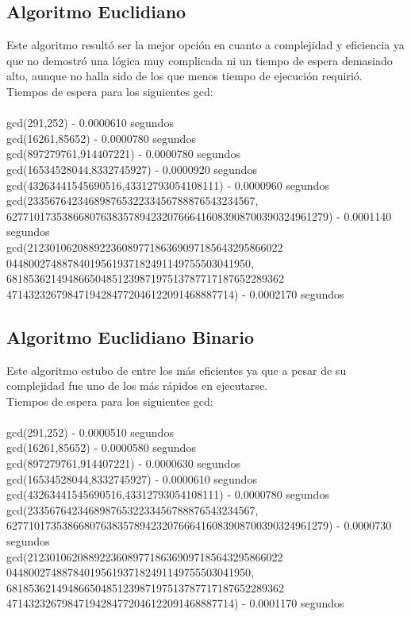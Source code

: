 \documentclass[12pt,letterpaper]{scrartcl}
\begin{document}
\subsection{Algoritmo Euclidiano}

Este algoritmo resultó ser la mejor opción en cuanto a complejidad y eficiencia ya que no demostró una lógica muy complicada ni un tiempo de espera demasiado alto, aunque no halla sido de los que menos tiempo de ejecución requirió.
\\
Tiempos de espera para los siguientes gcd:
\\\\
gcd(291,252) - 0.0000610 segundos
\\
gcd(16261,85652) - 0.0000780 segundos
\\
gcd(897279761,914407221) - 0.0000780 segundos
\\
gcd(16534528044,8332745927) - 0.0000920 segundos
\\
gcd(43263441545690516,43312793054108111) - 0.0000960 segundos
\\
gcd(23356764234689876532233456788876543234567,\\
6277101735386680763835789423207666416083908700390324961279) - 0.0001140 segundos
\\
gcd(2123010620889223608977186369097185643295866022\\04480027488784019561937182491149755503041950,\\
68185362149486650485123987197513787717187652289362\\47143232679847194284772046122091468887714) - 0.0002170 segundos


\newpage

\subsection{Algoritmo Euclidiano Binario}

Este algoritmo estubo de entre los más eficientes ya que a pesar de su complejidad fue uno de los más rápidos en ejecutarse.
\\
Tiempos de espera para los siguientes gcd:
\\\\
gcd(291,252) - 0.0000510 segundos
\\
gcd(16261,85652) - 0.0000580 segundos
\\
gcd(897279761,914407221) - 0.0000630 segundos
\\
gcd(16534528044,8332745927) - 0.0000610 segundos
\\
gcd(43263441545690516,43312793054108111) - 0.0000780 segundos
\\
gcd(23356764234689876532233456788876543234567,\\
6277101735386680763835789423207666416083908700390324961279) - 0.0000730 segundos
\\
gcd(2123010620889223608977186369097185643295866022\\04480027488784019561937182491149755503041950,\\
68185362149486650485123987197513787717187652289362\\47143232679847194284772046122091468887714) - 0.0001170 segundos
\end{document}

